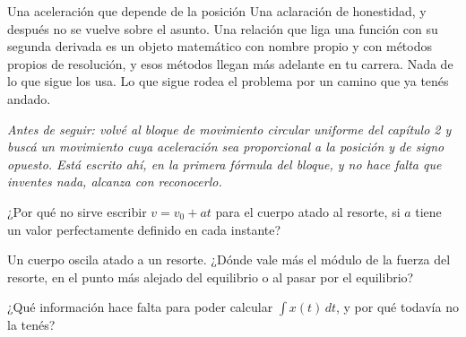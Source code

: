 \documentclass[11pt,openany]{book}
\begin{document}
\begin{bloque}{Una aceleración que depende de la posición}
Una aclaración de honestidad, y después no se vuelve sobre el asunto. Una relación que liga una función con su segunda derivada es un objeto matemático con nombre propio y con métodos propios de resolución, y esos métodos llegan más adelante en tu carrera. Nada de lo que sigue los usa. Lo que sigue rodea el problema por un camino que ya tenés andado.

\textit{Antes de seguir: volvé al bloque de movimiento circular uniforme del capítulo 2 y buscá un movimiento cuya aceleración sea proporcional a la posición y de signo opuesto. Está escrito ahí, en la primera fórmula del bloque, y no hace falta que inventes nada, alcanza con reconocerlo.}
\end{bloque}

\begin{chequeo}
\item ¿Por qué no sirve escribir $v = v_0 + at$ para el cuerpo atado al resorte, si $a$ tiene un valor perfectamente definido en cada instante?
\item Un cuerpo oscila atado a un resorte. ¿Dónde vale más el módulo de la fuerza del resorte, en el punto más alejado del equilibrio o al pasar por el equilibrio?
\item ¿Qué información hace falta para poder calcular $\int x(t)\,dt$, y por qué todavía no la tenés?
\end{chequeo}
\end{document}
